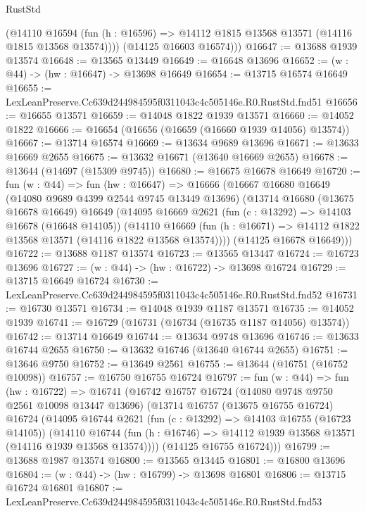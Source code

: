 \begin{lexlean}{RustStd}
\begin{coremodule}
          (@14110
            @16594
            (fun (h : @16596) => @14112 @1815 @13568 @13571 (@14116 @1815 @13568 @13574))))
        (@14125 @16603 @16574)))
@16647 := @13688 @1939 @13574
@16648 := @13565 @13449
@16649 := @16648 @13696
@16652 := (w : @44) -> (hw : @16647) -> @13698 @16649
@16654 := @13715 @16574 @16649
@16655 := LexLeanPreserve.Cc639d244984595f0311043c4c505146e.R0.RustStd.fnd51
@16656 := @16655 @13571
@16659 := @14048 @1822 @1939 @13571
@16660 := @14052 @1822
@16666 := @16654 (@16656 (@16659 (@16660 @1939 @14056) @13574))
@16667 := @13714 @16574
@16669 := @13634 @9689 @13696
@16671 := @13633 @16669 @2655
@16675 := @13632 @16671 (@13640 @16669 @2655)
@16678 := @13644 (@14697 (@15309 @9745))
@16680 := @16675 @16678 @16649
@16720 := fun (w : @44) =>
  fun (hw : @16647) =>
  @16666
    (@16667
      @16680
      @16649
      (@14080 @9689 @4399 @2544 @9745 @13449 @13696)
      (@13714
        @16680
        (@13675 @16678 @16649)
        @16649
        (@14095
          @16669
          @2621
          (fun (c : @13292) => @14103 @16678 (@16648 @14105))
          (@14110
            @16669
            (fun (h : @16671) => @14112 @1822 @13568 @13571 (@14116 @1822 @13568 @13574))))
        (@14125 @16678 @16649)))
@16722 := @13688 @1187 @13574
@16723 := @13565 @13447
@16724 := @16723 @13696
@16727 := (w : @44) -> (hw : @16722) -> @13698 @16724
@16729 := @13715 @16649 @16724
@16730 := LexLeanPreserve.Cc639d244984595f0311043c4c505146e.R0.RustStd.fnd52
@16731 := @16730 @13571
@16734 := @14048 @1939 @1187 @13571
@16735 := @14052 @1939
@16741 := @16729 (@16731 (@16734 (@16735 @1187 @14056) @13574))
@16742 := @13714 @16649
@16744 := @13634 @9748 @13696
@16746 := @13633 @16744 @2655
@16750 := @13632 @16746 (@13640 @16744 @2655)
@16751 := @13646 @9750
@16752 := @13649 @2561
@16755 := @13644 (@16751 (@16752 @10098))
@16757 := @16750 @16755 @16724
@16797 := fun (w : @44) =>
  fun (hw : @16722) =>
  @16741
    (@16742
      @16757
      @16724
      (@14080 @9748 @9750 @2561 @10098 @13447 @13696)
      (@13714
        @16757
        (@13675 @16755 @16724)
        @16724
        (@14095
          @16744
          @2621
          (fun (c : @13292) => @14103 @16755 (@16723 @14105))
          (@14110
            @16744
            (fun (h : @16746) => @14112 @1939 @13568 @13571 (@14116 @1939 @13568 @13574))))
        (@14125 @16755 @16724)))
@16799 := @13688 @1987 @13574
@16800 := @13565 @13445
@16801 := @16800 @13696
@16804 := (w : @44) -> (hw : @16799) -> @13698 @16801
@16806 := @13715 @16724 @16801
@16807 := LexLeanPreserve.Cc639d244984595f0311043c4c505146e.R0.RustStd.fnd53

\end{coremodule}
\end{lexlean}
